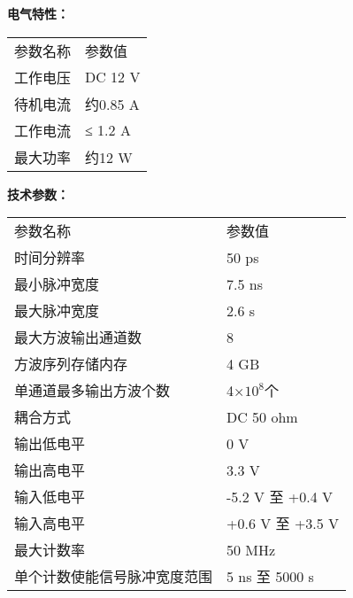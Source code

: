 \vspace{0.4cm}
\noindent\xiaosi\textbf{电气特性：}
\vspace{0.1cm}
\song
\begin{table}[H]
\normalsize
{}
\begin{tabular}{m{6.5cm}|m{6.5cm}}
\rowcolor{myblue}
\color{white}参数名称& \color{white}参数值\\\arrayrulecolor{tabcolor}\midrule[1.2pt]
工作电压& DC 12 V\\\arrayrulecolor{tabcolor}\midrule[1.2pt]
待机电流& 约0.85 A\\\arrayrulecolor{tabcolor}\midrule[1.2pt]
工作电流& ≤ 1.2 A\\\arrayrulecolor{tabcolor}\midrule[1.2pt]
最大功率& 约12 W\\
\end{tabular}
\end{table}

\vspace{0.4cm}
\noindent\xiaosi\textbf{技术参数：}
\vspace{0.1cm}
\song
\begin{table}[H]
{}
\begin{tabular}{m{6.5cm}|m{6.5cm}}
\rowcolor{myblue}
\color{white}参数名称& \color{white}参数值\\\arrayrulecolor{tabcolor}\midrule[1.2pt]
时间分辨率& 50 ps\\\arrayrulecolor{tabcolor}\midrule[1.2pt]
最小脉冲宽度& 7.5 ns \\\arrayrulecolor{tabcolor}\midrule[1.2pt]
最大脉冲宽度& 2.6 s\\\arrayrulecolor{tabcolor}\midrule[1.2pt]
最大方波输出通道数& 8\\\arrayrulecolor{tabcolor}\midrule[1.2pt]
方波序列存储内存& 4 GB\\\arrayrulecolor{tabcolor}\midrule[1.2pt]
单通道最多输出方波个数& 4×$10^{8}$个\\\midrule[1.2pt]
耦合方式& DC 50 ohm\\\arrayrulecolor{tabcolor}\midrule[1.2pt]
输出低电平& 0 V\\\arrayrulecolor{tabcolor}\midrule[1.2pt]
输出高电平& 3.3 V\\\arrayrulecolor{tabcolor}\midrule[1.2pt]
输入低电平& -5.2 V 至 +0.4 V\\\arrayrulecolor{tabcolor}\midrule[1.2pt]
输入高电平& +0.6 V 至 +3.5 V\\\arrayrulecolor{tabcolor}\midrule[1.2pt]
最大计数率& 50 MHz\\\arrayrulecolor{tabcolor}\midrule[1.2pt]
单个计数使能信号脉冲宽度范围& 5 ns 至 5000 s\\
\end{tabular}
\end{table}


